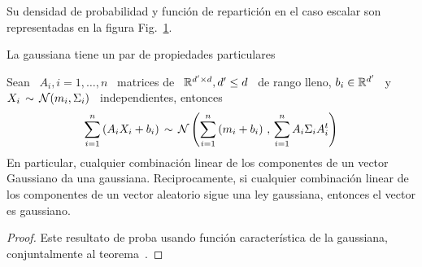 Su densidad de probabilidad y funci\'on  de repartici\'on en el caso escalar son
representadas en la figura Fig.~\ref{Fig:MP:Gaussiana}.
%
\begin{figure}[h!]
\begin{center}  \end{center}
% 
\label{Fig:MP:Gaussiana}
\end{figure}

La gaussiana tiene un par de propiedades particulares
%
\begin{teorema}[Stabilidad]
\label{Teo:MP:StabilidadGaussiana}
%
  Sean \ $A_i , i = 1,\ldots,n$ \  matrices de \ $\mathbb{R}^{d' \times d}, d' \le d$
  \ de rango lleno, $b_i \in \mathbb{R}^{d'}$ \ y \ $X_i \, \sim \, \mathcal{N}(m_i,\Sigma_i)$
  \ independientes, entonces
  \[
  \sum_{i=1}^n \left(  A_i X_i  + b_i \right)  \, \sim \,  \mathcal{N}\left( \sum_{i=1}^n
    \left( m_i + b_i \right) \, , \, \sum_{i=1}^n A_i \Sigma_i A_i^t \right)
  \]
  En particular, cualquier combinaci\'on linear  de los componentes de un vector
  Gaussiano da una gaussiana.  Reciprocamente, si cualquier combinaci\'on linear
  de los componentes de un vector aleatorio sigue una ley gaussiana, entonces el
  vector es gaussiano.
\end{teorema}
%
\begin{proof}
  Este  resultato de proba  usando funci\'on  caracter\'istica de  la gaussiana,
  conjuntalmente al teorema~\cite{Teo:MP:PropiedadesFuncionCaracteristica}.
\end{proof}






\label{Sssec:MP:Gamma}

